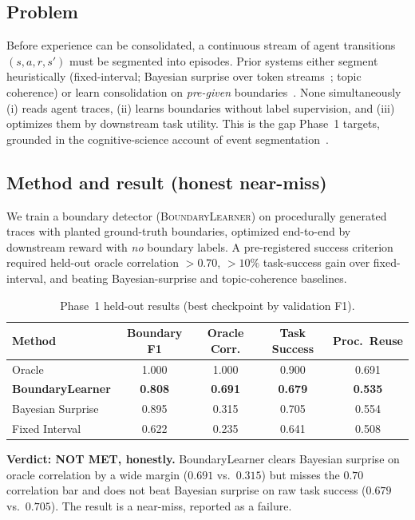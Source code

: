 \documentclass[11pt]{article}
\begin{document}
\subsection{Problem}
Before experience can be consolidated, a continuous stream of agent transitions
$(s,a,r,s')$ must be segmented into episodes. Prior systems either segment
heuristically (fixed-interval; Bayesian surprise over token
streams~\cite{emllm}; topic coherence) or learn consolidation on \emph{pre-given}
boundaries~\cite{genagents,hipporag}. None simultaneously (i) reads agent traces,
(ii) learns boundaries without label supervision, and (iii) optimizes them by
downstream task utility. This is the gap Phase~1 targets, grounded in the
cognitive-science account of event segmentation~\cite{zacks,tulving}.

\subsection{Method and result (honest near-miss)}
We train a boundary detector (\textsc{BoundaryLearner}) on procedurally generated
traces with planted ground-truth boundaries, optimized end-to-end by downstream
reward with \emph{no} boundary labels. A pre-registered success criterion required
held-out oracle correlation $>0.70$, $>10\%$ task-success gain over fixed-interval,
and beating Bayesian-surprise and topic-coherence baselines.

\begin{table}[h]\centering\small
\caption{Phase~1 held-out results (best checkpoint by validation F1).}
\begin{tabular}{lcccc}
\toprule
Method & Boundary F1 & Oracle Corr. & Task Success & Proc.\ Reuse \\
\midrule
Oracle & 1.000 & 1.000 & 0.900 & 0.691 \\
\textbf{BoundaryLearner} & \textbf{0.808} & \textbf{0.691} & \textbf{0.679} & \textbf{0.535} \\
Bayesian Surprise & 0.895 & 0.315 & 0.705 & 0.554 \\
Fixed Interval & 0.622 & 0.235 & 0.641 & 0.508 \\
\bottomrule
\end{tabular}
\end{table}

\textbf{Verdict: NOT MET, honestly.} BoundaryLearner clears Bayesian surprise on
oracle correlation by a wide margin ($0.691$ vs.\ $0.315$) but misses the $0.70$
correlation bar and does not beat Bayesian surprise on raw task success
($0.679$ vs.\ $0.705$). The result is a near-miss, reported as a failure.
\end{document}
